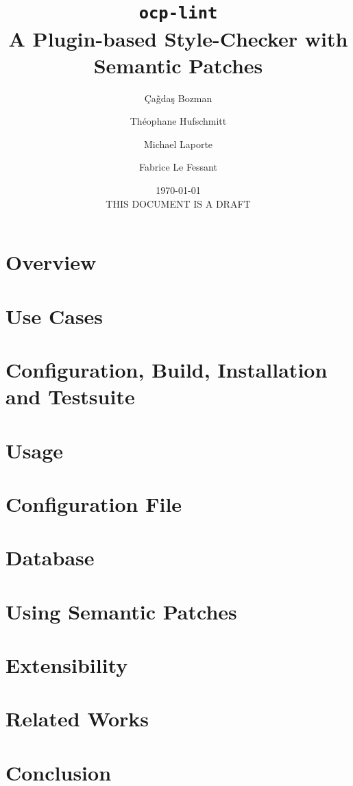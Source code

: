 \documentclass[a4paper,11pt]{article}
\title{{\bf {\tt ocp-lint}\\
 A Plugin-based Style-Checker with Semantic Patches}}
\author[1]{\c{C}a\~{g}da\c{s} Bozman}
\author[1]{Th\'eophane Hufschmitt}
\author[1]{Michael Laporte}
\author[1,2]{Fabrice Le Fessant}
\affil[1]{OCamlPro}
\affil[2]{INRIA}
\date{\today{}\\
THIS DOCUMENT IS A DRAFT}
\begin{document}
\def\ocplint{{\sf ocp-lint}}

\maketitle

\newpage

\tableofcontents

\newpage

\section{Overview}
\label{sec:overview}


\section{Use Cases}
\label{sec:use-cases}


\section{Configuration, Build, Installation and Testsuite}
\label{sec:config-build-install}


\section{Usage}
\label{sec:usage}


\section{Configuration File}
\label{sec:configuration}


\section{Database}
\label{sec:database}


\section{Using Semantic Patches}
\label{sec:sempatch}


\section{Extensibility}
\label{sec:extensibility}


\section{Related Works}
\label{sec:related}


\section{Conclusion}
\label{sec:conclusion}



 
\end{document}
